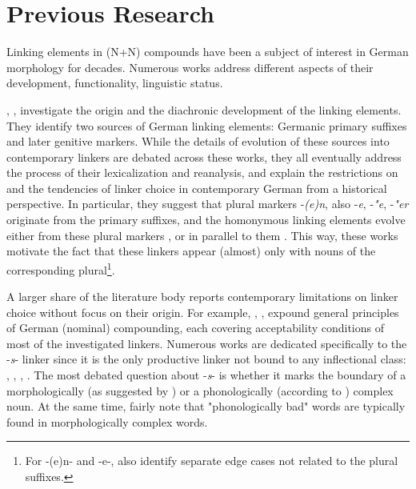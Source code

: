 \documentclass[10pt, a4paper]{article}
\begin{document}

\section{Previous Research}
\label{sec:back}

Linking elements in (N+N) compounds have been a subject of interest in German morphology for decades. Numerous works address different aspects of their development, functionality, linguistic status.

\citet{nuebling_szczepaniak_2013}, \citet{wegener_2003}, \citet{wegener_2005} investigate the origin and the diachronic development of the linking elements. They identify two sources of German linking elements: Germanic primary suffixes and later genitive markers. While the details of evolution of these sources into contemporary linkers are debated across these works, they all eventually address the process of their lexicalization and reanalysis, and explain the restrictions on and the tendencies of linker choice in contemporary German from a historical perspective. In particular, they suggest that plural markers -\textit{(e)n}, also -\textit{e}, -\textit{"e}, -\textit{"er} originate from the primary suffixes, and the homonymous linking elements evolve either from these plural markers \citep{nuebling_szczepaniak_2013}, or in parallel to them \citep{wegener_2003}. This way, these works motivate the fact that these linkers appear (almost) only with nouns of the corresponding plural\footnote{For -(e)n- and -e-, \citet{nuebling_szczepaniak_2013} also identify separate edge cases not related to the plural suffixes.}. 

A larger share of the literature body reports contemporary limitations on linker choice without focus on their origin. For example, \citet[chapter 6.2]{eisenberg_2013}, \citet[chapter A.5]{ortner_mueller-bollhagen_1991}, \citet[chapter 8.1]{schaefer_2018} expound general principles of German (nominal) compounding, each covering acceptability conditions of most of the investigated linkers. Numerous works are dedicated specifically to the -\textit{s}- linker since it is the only productive linker not bound to any inflectional class: \citet{libben_etal_2009}, \citet{kopf_2017}, \citet{kuerschner_2005}, \citet{nuebling_szczepaniak_2008}. The most debated question about -\textit{s}- is whether it marks the boundary of a morphologically (as suggested by \citealp{kuerschner_2005}) or a phonologically (according to \citealp{nuebling_szczepaniak_2008}) complex noun. At the same time, \citet{fuhrhop_kuerschner_2015} fairly note that "phonologically bad" words are typically found in morphologically complex words. 
\end{document}
